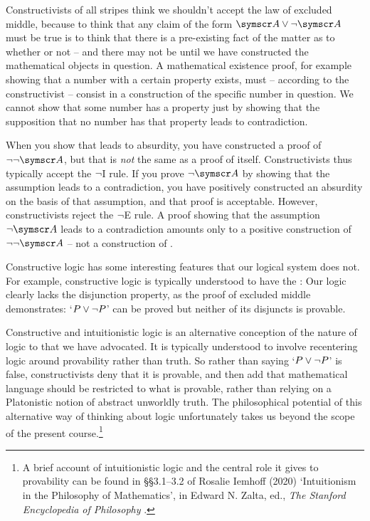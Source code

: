 Constructivists of all stripes think we shouldn't accept the law of excluded middle, because to think that any claim of the form $\meta{A}\eor\enot\meta{A}$ must be true is to think that there is a pre-existing fact of the matter as to whether or not  – and there may not be until we have constructed the mathematical objects in question. A mathematical existence proof, for example showing that a number with a certain property exists, must – according to the constructivist – consist in a construction of the specific number in question. We cannot show that some number has a property just by showing that the supposition that no number has that property leads to contradiction. 

When you show that \enot{} leads to absurdity, you have constructed a proof of $\enot\enot\meta{A}$, but that is \emph{not} the same as a proof of  itself. Constructivists thus typically accept the $\neg$I  rule. If you prove $\enot\meta{A}$ by showing that the assumption  leads to a contradiction, you have positively constructed an absurdity on the basis of that assumption, and that proof is acceptable. However, constructivists reject the $\neg$E rule. A proof showing that the assumption $\enot\meta{A}$ leads to a contradiction amounts only to a positive construction of $\enot\enot\meta{A}$ – not a construction of . 

Constructive logic has some interesting features that our logical system does not. For example, constructive logic is typically understood to have the :  Our logic clearly lacks the disjunction property, as the proof of excluded middle demonstrates: `$P\vee\neg P$' can be proved but neither of its disjuncts is provable. 

Constructive and intuitionistic logic is an alternative conception of the nature of logic to that we have advocated. It is typically understood to involve recentering logic around provability rather than truth. So rather than saying `$P\vee\neg P$' is false, constructivists deny that it is provable, and then add that mathematical language should be restricted to what is provable, rather than relying on a Platonistic notion of abstract unworldly truth. The philosophical potential of this alternative way of thinking about logic unfortunately takes us beyond the scope of the present course.\footnote{A brief account of intuitionistic logic and the central role it gives to provability can be found in §§3.1–3.2 of  Rosalie Iemhoff (2020) `Intuitionism in the Philosophy of Mathematics', in Edward N. Zalta, ed., \emph{The Stanford Encyclopedia of Philosophy} .}


